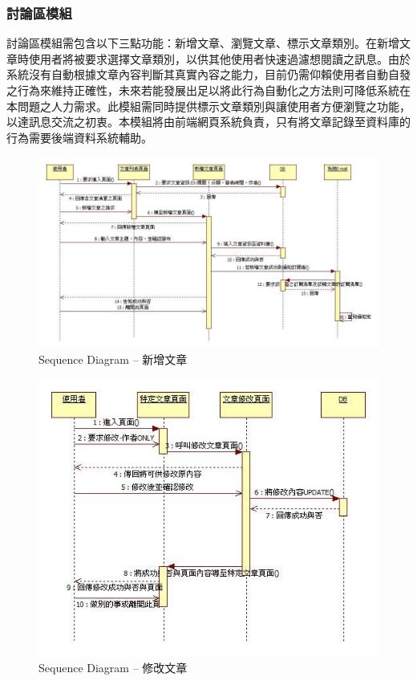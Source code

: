 \subsubsection{討論區模組}
討論區模組需包含以下三點功能：新增文章、瀏覽文章、標示文章類別。在新增文章時使用者將被要求選擇文章類別，以供其他使用者快速過濾想閱讀之訊息。由於系統沒有自動根據文章內容判斷其真實內容之能力，目前仍需仰賴使用者自動自發之行為來維持正確性，未來若能發展出足以將此行為自動化之方法則可降低系統在本問題之人力需求。此模組需同時提供標示文章類別與讓使用者方便瀏覽之功能，以達訊息交流之初衷。本模組將由前端網頁系統負責，只有將文章記錄至資料庫的行為需要後端資料系統輔助。

\begin{figure}[H]
\centering
\includegraphics[width=1.05\textwidth]{img/useseq/stage2/seqNewArticle.jpg}
\caption{Sequence Diagram -- 新增文章}
\label{pic:seq:newArticle}
\end{figure}

\begin{figure}[H]
\centering
\includegraphics[width=.8\textwidth]{img/useseq/stage2/seqEditArticle.jpg}
\caption{Sequence Diagram -- 修改文章}
\label{pic:seq:editArticle}
\end{figure}

